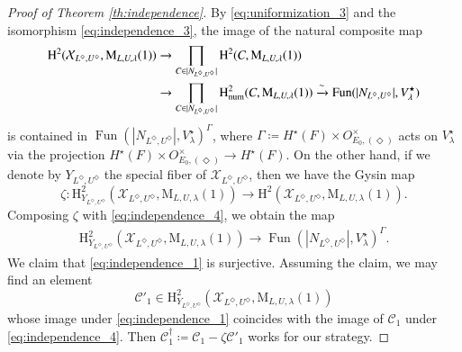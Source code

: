 \documentclass[12pt]{amsart}
\numberwithin{equation}{section}
\theoremstyle{plain}
\theoremstyle{definition}
\theoremstyle{remark}
\renewcommand{\c}[1]{\mathcal{#1}}
\renewcommand{\r}[1]{\mathrm{#1}}
\renewcommand{\(}{\left(}
\renewcommand{\)}{\right)}
\newcommand{\cC}{\c C}
\newcommand{\cX}{\c X}
\newcommand{\rH}{\r H}
\newcommand{\rM}{\r M}
\newcommand{\num}{\r{num}}
\DeclareMathOperator{\Fun}{Fun}
\begin{document}
\begin{proof}[Proof of Theorem \ref{th:independence}]
By \eqref{eq:uniformization_3} and the isomorphism \eqref{eq:independence_3}, the image of the natural composite map
\begin{align}\label{eq:independence_4}
\rH^2(\cX_{L^\Diamond,U^\Diamond},\rM_{L,U,\lambda}(1))
&\to\prod_{C\in|N_{L^\Diamond,U^\Diamond}|}\rH^2(C,\rM_{L,U,\lambda}(1)) \\
&\to\prod_{C\in|N_{L^\Diamond,U^\Diamond}|}\rH^2_\num(C,\rM_{L,U,\lambda}(1))\xrightarrow\sim
\Fun(|N_{L^\Diamond,U^\Diamond}|,V^\star_\lambda) \notag
\end{align}
is contained in $\Fun(|N_{L^\Diamond,U^\Diamond}|,V^\star_\lambda)^\Gamma$, where $\Gamma\coloneqq H^\star(F)\times O_{E_0,(\Diamond)}^\times$ acts on $V^\star_\lambda$ via the projection $H^\star(F)\times O_{E_0,(\Diamond)}^\times\to H^\star(F)$. On the other hand, if we denote by $Y_{L^\Diamond,U^\Diamond}$ the special fiber of $\cX_{L^\Diamond,U^\Diamond}$, then we have the Gysin map
\[
\zeta\colon\rH^2_{Y_{L^\Diamond,U^\Diamond}}(\cX_{L^\Diamond,U^\Diamond},\rM_{L,U,\lambda}(1))\to
\rH^2(\cX_{L^\Diamond,U^\Diamond},\rM_{L,U,\lambda}(1)).
\]
Composing $\zeta$ with \eqref{eq:independence_4}, we obtain the map
\begin{align}\label{eq:independence_1}
\rH^2_{Y_{L^\Diamond,U^\Diamond}}(\cX_{L^\Diamond,U^\Diamond},\rM_{L,U,\lambda}(1))
\to\Fun(|N_{L^\Diamond,U^\Diamond}|,V^\star_\lambda)^\Gamma.
\end{align}
We claim that \eqref{eq:independence_1} is surjective. Assuming the claim, we may find an element
\[
\cC'_1\in\rH^2_{Y_{L^\Diamond,U^\Diamond}}(\cX_{L^\Diamond,U^\Diamond},\rM_{L,U,\lambda}(1))
\]
whose image under \eqref{eq:independence_1} coincides with the image of $\cC_1$ under \eqref{eq:independence_4}. Then $\cC^\dag_1\coloneqq\cC_1-\zeta\cC'_1$ works for our strategy.




\end{proof}
\end{document}
